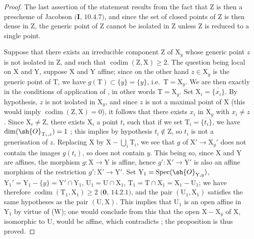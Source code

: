\begin{proof}
The last assertion of the statement results from the fact that $\mathrm{Z}$ is then a prescheme of Jacobson $(\mathbf{I}$, $10.4.7)$, and since the set of closed points of $\mathrm{Z}$ is then dense in $\mathrm{Z}$, the generic point of $\mathrm{Z}$ cannot be isolated in $\mathrm{Z}$ unless $\mathrm{Z}$ is reduced to a single point.

Suppose that there exists an irreducible component $\mathrm{Z}$ of $\mathrm{X}_y$ whose generic point $z$ is not isolated in $\mathrm{Z}$, and such that $\operatorname{codim}(\mathrm{Z},\mathrm{X})\geq 2$.
The question being local on $\mathrm{X}$ and $\mathrm{Y}$, suppose $\mathrm{X}$ and $\mathrm{Y}$ affine; since on the other hand $z\in\mathrm{X}_y$ is the generic point of $\mathrm{T}$, we have $g(\mathrm{T})\subset\overline{\{y\}}=\{y\}$, i.e.\ $\mathrm{T}=\mathrm{X}_y$.
We are then exactly in the conditions of application of , in other words $\mathrm{T}=\mathrm{X}_y$.
Set $\mathrm{X}_i=\overline{\{x_i\}}$.
By hypothesis, $z$ is not isolated in $\mathrm{X}_y$, and since $z$ is not a maximal point of $\mathrm{X}$ (this would imply $\operatorname{codim}(\mathrm{Z},\mathrm{X})=0$), it follows that there exists $x_i$ in $\mathrm{X}_y$ with $x_i\neq z$.
Since $\mathrm{X}_i\neq\mathrm{Z}$, there exists $\mathrm{X}_i$ a point $t_i$ such that if we set $\mathrm{T}_i=\overline{\{t_i\}}$, we have $\dim(\sh{O}_{\mathrm{T}_i,z})=1$ ; this implies by hypothesis $t_i\notin\mathrm{Z}$, so $t_i$ is not a generisation of $z$.
Replacing $\mathrm{X}$ by $\mathrm{X}-\bigcup_i\mathrm{T}_i$, we see that $g$ of $\mathrm{X}'\to\mathrm{X}_y'$ does not contain the images $g(t_i)$, so does not contain $y$.
This being so, since $\mathrm{X}$ and $\mathrm{Y}$ are affines, the morphism $g:\mathrm{X}\to\mathrm{Y}$ is affine, hence $g':\mathrm{X}'\to\mathrm{Y}'$ is also an affine morphism of the restriction $g':\mathrm{X}'\to\mathrm{Y}'$.
Set $\mathrm{Y}_1=\operatorname{Spec}(\sh{O}_{\mathrm{Y},y})$, $\mathrm{Y}_1'=\mathrm{Y}_1-\{y\}=\mathrm{Y}'\cap\mathrm{Y}_1$, $\mathrm{U}_1=\mathrm{U}\cap\mathrm{X}_1$, $\mathrm{T}_1=\mathrm{T}\cap\mathrm{X}_1=\mathrm{X}_1-\mathrm{U}_1$; we have therefore $\operatorname{codim}(\mathrm{T}_1,\mathrm{X}_1)\geq 2$ $(\mathbf{0}$, $14.2.1)$, and the pair $(\mathrm{U}_1,\mathrm{X}_1)$ satisfies the same hypotheses as the pair $(\mathrm{U},\mathrm{X})$.
This implies that $\mathrm{U}_1$ is an open affine in $\mathrm{Y}_1$ by virtue of (W); one would conclude from this that the open $\mathrm{X}-\mathrm{X}_y$ of $\mathrm{X}$, isomorphic to $\mathrm{U}$, would be affine, which contradicts ; the proposition is thus proved.
\end{proof}

